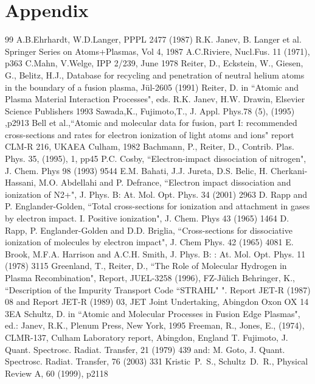 \documentclass[12pt,dvips]{article}
\begin{document}
\section{Appendix}
\newpage
\begin{thebibliography}{99}
  A.B.Ehrhardt, W.D.Langer, PPPL 2477 (1987)
 R.K. Janev, B. Langer et al.  Springer Series on Atoms+Plasmas,
                   Vol 4, 1987
 A.C.Riviere, Nucl.Fus. 11 (1971), p363
 C.Mahn, V.Welge, IPP 2/239, June 1978
 Reiter, D., Eckstein, W., Giesen, G., Belitz,
                    H.J.,
                    Database for recycling and penetration of neutral
                    helium atoms in the boundary of a fusion plasma,
                    J\"ul-2605 (1991)
  Reiter, D. in ``Atomic and Plasma Material Interaction Processes", eds. R.K. Janev, H.W. Drawin, Elsevier Science Publishers 1993
 Sawada,K.,  Fujimoto,T., J. Appl. Phys.78 (5), (1995)
                    ,p2913
  Bell et al.,``Atomic and molecular data for fusion, part I:
recommended cross-sections and rates for electron ionization of light atoms and ions"
 report CLM-R 216, UKAEA Culham, 1982
  Bachmann, P., Reiter, D., Contrib. Plas. Phys.
                       35, (1995), 1, pp45
  P.C. Cosby, ``Electron-impact dissociation of nitrogen", J. Chem. Phys 98 (1993) 9544
 E.M. Bahati, J.J. Jureta, D.S. Belic, H. Cherkani-Hassani, M.O. Abdellahi and P. Defrance, ``Electron impact dissociation and ionization of N2+",
J. Phys. B: At. Mol. Opt. Phys. 34 (2001) 2963
 D. Rapp and P. Englander-Golden, ``Total cross-sections for ionization and attachment in gases by electron impact. I. Positive ionization", J. Chem. Phys 43 (1965) 1464
 D. Rapp, P. Englander-Golden and D.D. Briglia, ``Cross-sections for dissociative ionization of molecules by electron impact", J. Chem Phys. 42 (1965) 4081
 E. Brook, M.F.A. Harrison and A.C.H. Smith, J. Phys. B: : At. Mol. Opt. Phys. 11 (1978) 3115
 Greenland, T., Reiter, D.,
                   ``The Role of Molecular Hydrogen in Plasma
                    Recombination", Report, JUEL-3258 (1996), FZ-J\"ulich
 Behringer, K.,
``Description of the Impurity Transport Code ``STRAHL" ".
Report JET-R (1987) 08 and
Report JET-R (1989) 03, JET Joint Undertaking, Abingdon Oxon OX 14 3EA
 Schultz, D. in ``Atomic and Molecular Processes in Fusion
                     Edge Plasmas", ed.: Janev, R.K., Plenum Press, New York, 1995
 Freeman, R., Jones, E., (1974), CLMR-137, Culham Laboratory report, Abingdon, England
 T.  Fujimoto, J. Quant. Spectrosc. Radiat. Transfer, 21 (1979) 439 and:
M. Goto, J. Quant. Spectrosc. Radiat. Transfer, 76 (2003) 331
 Kristic~P.~S., Schultz~D.~R., Physical Review A, 60 (1999), p2118
 \end{thebibliography}
\end{document}
